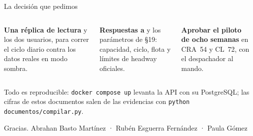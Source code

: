 \documentclass[aspectratio=169,10pt]{beamer}
\newcommand{\fuenteactual}{}
\newcommand{\cifraazul}[2]{\leavevmode{\fontsize{21}{23}\selectfont\textcolor{rol-modelo}{#1}}\par\vspace{1pt}{\scriptsize\color{rol-tinta-2}#2}\par}
\newcommand{\gris}[1]{\textcolor{rol-tinta-2}{#1}}
\newcommand{\fte}[1]{\renewcommand{\fuenteactual}{Fuente: #1}}
\begin{document}
\fte{\path{api_frecuencias/docs/hallazgos_extreme.md}; \path{README.md}; \path{PLAN_EVOLUCION.md}; E01 y E02}
\begin{frame}[t]
\vspace{10pt}
{\fontsize{26}{30}\selectfont La decisión que pedimos}\par\vspace{10pt}
\begin{columns}[T]
\begin{column}{0.31\linewidth}
\begin{tarjeta}[height=3.6cm]
\cifraazul{1}{}
\textbf{Una réplica de lectura} y los dos usuarios, para correr el ciclo diario contra los datos reales en modo
sombra.
\end{tarjeta}
\end{column}
\begin{column}{0.31\linewidth}
\begin{tarjeta}[height=3.6cm]
\cifraazul{2}{}
\textbf{Respuestas a \PlanHallazgosUrgentes} y los parámetros de §19: capacidad, ciclo, flota y límites de headway
oficiales.
\end{tarjeta}
\end{column}
\begin{column}{0.31\linewidth}
\begin{tarjeta}[height=3.6cm]
\cifraazul{3}{}
\textbf{Aprobar el piloto de ocho semanas} en CRA~54 y CL~72, con el despachador al mando.
\end{tarjeta}
\end{column}
\end{columns}
\vspace{10pt}
{\small\gris{Todo es reproducible: \texttt{docker compose up} levanta la API con su PostgreSQL; las cifras de estos
documentos salen de las evidencias con \texttt{python documentos/compilar.py}.}}\par\vspace{6pt}
{\small Gracias. \gris{Abrahan Basto Martínez · Rubén Esguerra Fernández · Paula Gómez}}
\end{frame}
\end{document}
